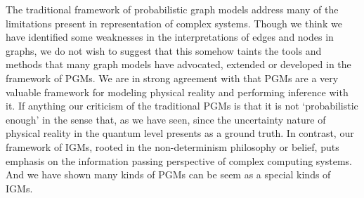 \documentclass[10pt,onecolumn,letterpaper]{article}
\begin{document}
\begin{CJK*}{UTF8}{gbsn}
The traditional framework of probabilistic graph models address many of the limitations present in representation of complex systems. Though we think we have identified some weaknesses in the interpretations of edges and nodes in graphs, we do not wish to suggest that this somehow taints the tools and methods that many graph models have advocated, extended or developed in the framework of PGMs. We are in strong agreement with that PGMs are a very valuable framework for modeling physical reality and performing inference with it. If anything our criticism of the traditional PGMs is that it is not ‘probabilistic enough’ in the sense that, as we have seen, since the uncertainty nature of physical reality in the quantum level presents as a ground truth. In contrast, our framework of IGMs, rooted in the non-determinism philosophy or belief, puts emphasis on the information passing perspective of complex computing systems. And we have shown many kinds of PGMs can be seem as a special kinds of IGMs.




{\small


}

\end{CJK*}
\end{document}
